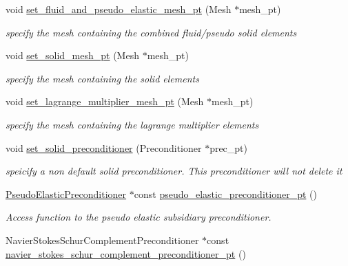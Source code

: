 \begin{DoxyCompactItemize}
void \hyperlink{classoomph_1_1PseudoElasticFSIPreconditioner_a8d0b7212ad06c4f5942fed253c680010}{set\+\_\+fluid\+\_\+and\+\_\+pseudo\+\_\+elastic\+\_\+mesh\+\_\+pt} (Mesh $\ast$mesh\+\_\+pt)
\begin{DoxyCompactList}\small\item\em specify the mesh containing the combined fluid/pseudo solid elements \end{DoxyCompactList}\item 
void \hyperlink{classoomph_1_1PseudoElasticFSIPreconditioner_af2c1fc8d2dd795c5a4a2ae266ad32d18}{set\+\_\+solid\+\_\+mesh\+\_\+pt} (Mesh $\ast$mesh\+\_\+pt)
\begin{DoxyCompactList}\small\item\em specify the mesh containing the solid elements \end{DoxyCompactList}\item 
void \hyperlink{classoomph_1_1PseudoElasticFSIPreconditioner_ad30185179d7c2bc6c725e550c48a0c90}{set\+\_\+lagrange\+\_\+multiplier\+\_\+mesh\+\_\+pt} (Mesh $\ast$mesh\+\_\+pt)
\begin{DoxyCompactList}\small\item\em specify the mesh containing the lagrange multiplier elements \end{DoxyCompactList}\item 
void \hyperlink{classoomph_1_1PseudoElasticFSIPreconditioner_a92e59f83606d77e7407a4ace534546f2}{set\+\_\+solid\+\_\+preconditioner} (Preconditioner $\ast$prec\+\_\+pt)
\begin{DoxyCompactList}\small\item\em speicify a non default solid preconditioner. This preconditioner will not delete it \end{DoxyCompactList}\item 
\hyperlink{classoomph_1_1PseudoElasticPreconditioner}{Pseudo\+Elastic\+Preconditioner} $\ast$const \hyperlink{classoomph_1_1PseudoElasticFSIPreconditioner_af10b20ad8e90cd99ba35326f1207d6a7}{pseudo\+\_\+elastic\+\_\+preconditioner\+\_\+pt} ()
\begin{DoxyCompactList}\small\item\em Access function to the pseudo elastic subsidiary preconditioner. \end{DoxyCompactList}\item 
Navier\+Stokes\+Schur\+Complement\+Preconditioner $\ast$const \hyperlink{classoomph_1_1PseudoElasticFSIPreconditioner_a4e13b64643e9026f421fa1228333ca95}{navier\+\_\+stokes\+\_\+schur\+\_\+complement\+\_\+preconditioner\+\_\+pt} ()

\end{DoxyCompactItemize}
